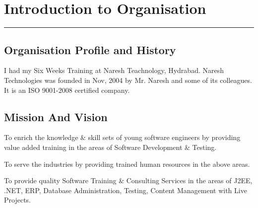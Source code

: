\chapter{Introduction to Organisation}\hrule
\label{Chapter:1}
\section {Organisation Profile and History}

I had my Six Weeks Training at Naresh Teachnology, Hydrabad. Naresh Technologies was founded in Nov, 2004 by Mr. Naresh and some of its colleagues. It is an ISO 9001-2008 certified company.
\\
\section {Mission And Vision}


To enrich the knowledge & skill sets of young software engineers by providing value added training in the areas of Software Development & Testing.

To serve the industries by providing trained human resources in the above areas.

To provide quality Software Training & Consulting Services in the areas of J2EE, .NET, ERP, Database Administration, Testing, Content Management with Live Projects.
\\
